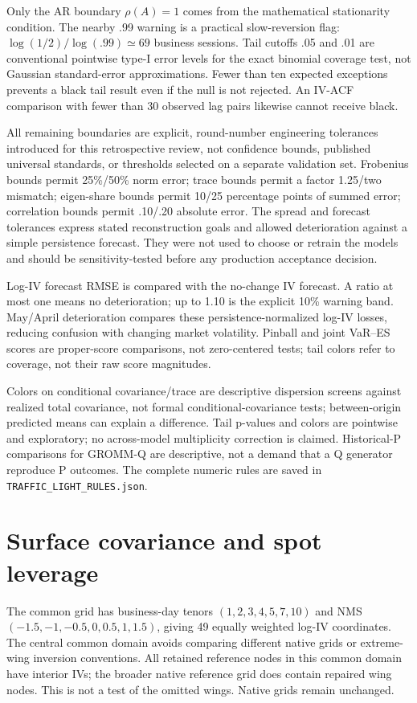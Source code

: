 \documentclass[11pt]{article}
\begin{document}
Only the AR boundary $\rho(A)=1$ comes from the mathematical stationarity condition. The nearby .99 warning is a practical slow-reversion flag: $\log(1/2)/\log(.99)\simeq69$ business sessions. Tail cutoffs .05 and .01 are conventional pointwise type-I error levels for the exact binomial coverage test, not Gaussian standard-error approximations. Fewer than ten expected exceptions prevents a black tail result even if the null is not rejected. An IV-ACF comparison with fewer than 30 observed lag pairs likewise cannot receive black.

All remaining boundaries are explicit, round-number engineering tolerances introduced for this retrospective review, not confidence bounds, published universal standards, or thresholds selected on a separate validation set. Frobenius bounds permit 25\%/50\% norm error; trace bounds permit a factor 1.25/two mismatch; eigen-share bounds permit 10/25 percentage points of summed error; correlation bounds permit .10/.20 absolute error. The spread and forecast tolerances express stated reconstruction goals and allowed deterioration against a simple persistence forecast. They were not used to choose or retrain the models and should be sensitivity-tested before any production acceptance decision.

Log-IV forecast RMSE is compared with the no-change IV forecast. A ratio at most one means no deterioration; up to 1.10 is the explicit 10\% warning band. May/April deterioration compares these persistence-normalized log-IV losses, reducing confusion with changing market volatility. Pinball and joint VaR--ES scores are proper-score comparisons, not zero-centered tests; tail colors refer to coverage, not their raw score magnitudes.

Colors on conditional covariance/trace are descriptive dispersion screens against realized total covariance, not formal conditional-covariance tests; between-origin predicted means can explain a difference. Tail p-values and colors are pointwise and exploratory; no across-model multiplicity correction is claimed. Historical-P comparisons for GROMM-Q are descriptive, not a demand that a Q generator reproduce P outcomes. The complete numeric rules are saved in \texttt{TRAFFIC\_LIGHT\_RULES.json}.

\section{Surface covariance and spot leverage}

The common grid has business-day tenors $(1,2,3,4,5,7,10)$ and NMS $(-1.5,-1,-0.5,0,0.5,1,1.5)$, giving 49 equally weighted log-IV coordinates. The central common domain avoids comparing different native grids or extreme-wing inversion conventions. All retained reference nodes in this common domain have interior IVs; the broader native reference grid does contain repaired wing nodes. This is not a test of the omitted wings. Native grids remain unchanged.
\end{document}
